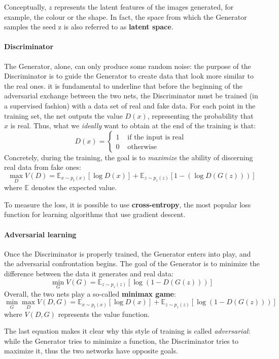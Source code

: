 \documentclass[target=mst,aauheader=aics]{thud}
\theoremstyle{definition}
\begin{document}
	Conceptually, $z$ represents the latent features of the images generated, for example, the colour or the shape. In fact, the space from which the Generator samples the seed z is also referred to as \textbf{latent space}.
	\paragraph{Discriminator}
	The Generator, alone, can only produce some random noise: the purpose of the Discriminator is to guide the Generator to create data that look more similar to the real ones. it is fundamental to underline that before the beginning of the adversarial exchange between the two nets, the Discriminator must be trained (in a supervised fashion) with a data set of real and fake data.
	For each point in the training set, the net outputs the value $D(x)$, representing the probability that $x$ is real. Thus, what we \textit{ideally} want to obtain at the end of the training is that:
	\[
	D(x) = \begin{cases}
		1 &\text{ if the input is real }\\
		0 & \text{ otherwise }
	\end{cases}
	\]
	Concretely, during the training, the goal is to \textit{maximize} the ability of discerning real data from fake ones:
	\[
	\max_D V(D) = \mathbb{E}_{x\sim p_t(x)}[\log D(x)] + \mathbb{E}_{z\sim p_z(z)}[1-(\log D(G(z)))]
	\]
	where $\mathbb{E}$ denotes the expected value.
	
	To measure the loss, it is possible to use \textbf{cross-entropy}, the most popular loss function for learning algorithms that use gradient descent.
	\paragraph{Adversarial learning}
	Once the Discriminator is properly trained, the Generator enters into play, and the adversarial confrontation begins. The goal of the Generator is to minimize the difference between the data it generates and real data:
	\[
	\min_G V(G) = \mathbb{E}_{z\sim p_z(z)}[\log(1-D(G(z)))]
	\]
	Overall, the two nets play a so-called \textbf{minimax game}:
	\[
	\min_G \max_D V(D,G) = \mathbb{E}_{x\sim p_t(x)}[\log D(x)] + \mathbb{E}_{z\sim p_z(z)}[\log (1-D(G(z)))]
	\]
	where $V(D,G)$ represents the value function.
	
	The last equation makes it clear why this style of training is called \textit{adversarial}: while the Generator tries to minimize a function, the Discriminator tries to maximize it, thus the two networks have opposite goals.
	
\end{document}
